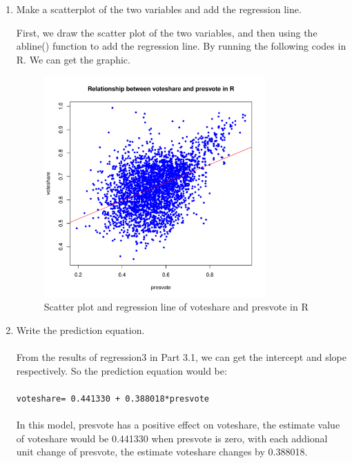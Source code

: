 \documentclass[12pt,letterpaper]{article}
\begin{document}
\begin{enumerate}
		\item Make a scatterplot of the two variables and add the regression line. 
		
		\noindent First, we draw the scatter plot of the two variables, and then using the abline() function to add the regression line. By running the following codes in R. We can get the graphic.
		
		
		
		\begin{figure}[h]
			\centering
			\includegraphics[width=0.8\textwidth]{Scatter plot and regression line of voteshare and presvote in R.pdf}
			\caption{Scatter plot and regression line of voteshare and presvote in R}
			\label{fig:pdf}
		\end{figure}
			\vspace{.15cm}
		
		\newpage	
		\item Write the prediction equation.\\
		\noindent \\From the results of regression3 in Part 3.1, we can get the intercept and slope respectively. So the prediction equation would be:\\  \\ \texttt{voteshare= 0.441330 + 0.388018*presvote} \\ \\ In this model, presvote has a positive effect on voteshare, the estimate value of voteshare would be 0.441330 when presvote is zero, with each addional unit change of presvote, the estimate voteshare changes by 0.388018.\\

	\end{enumerate}
	
\end{document}
